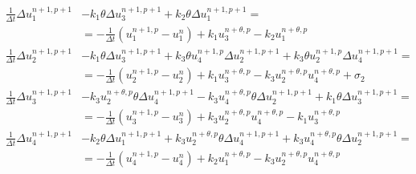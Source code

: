 \documentclass[biblatex]{mooiman_memo}
\newcommand{\Dt}{\Delta t}
\begin{document}
\begin{align}
    \frac{1}{\Dt}\Delta u_1^{n+1, p+1} &  - k_1  \theta \Delta u_3^{n+1, p+1} + k_2  \theta \Delta u_1^{n+1, p+1}  =
    \\
    & = - \frac{1}{\Dt}(u_1^{n+1,p} - u_1^n) + k_1 u_3^{n+\theta,p} - k_2 u_1^{n+\theta,p}
    \\
    \frac{1}{\Dt}\Delta u_2^{n+1, p+1} & - k_1 \theta \Delta u_3^{n+1, p+1}
    + k_3 \theta u_4^{n+1,p} \Delta u_2^{n+1, p+1} + k_3 \theta u_2^{n+1,p} \Delta u_4^{n+1, p+1}  =
    \\
    & = - \frac{1}{\Dt}(u_2^{n+1,p} - u_2^n) + k_1 u_3^{n+\theta,p} - k_3 u_2^{n+\theta,p} u_4^{n+\theta,p} +\sigma_2
    \\
    \frac{1}{\Dt}\Delta u_3^{n+1, p+1} & - k_3 u_2^{n+\theta,p} \theta \Delta u_4^{n+1, p+1} - k_3 u_4^{n+\theta,p} \theta \Delta u_2^{n+1, p+1} + k_1 \theta \Delta u_3^{n+1, p+1}  =
    \\
    & = - \frac{1}{\Dt}(u_3^{n+1,p} - u_3^n) + k_3 u_2^{n+\theta,p} u_4^{n+\theta,p} - k_1 u_3^{n+\theta,p}
    \\
    \frac{1}{\Dt}\Delta u_4^{n+1, p+1}&  - k_2 \theta \Delta u_1^{n+1, p+1}  + k_3 u_2^{n+\theta,p}\theta \Delta u_4^{n+1, p+1} +k_3 u_4^{n+\theta,p} \theta \Delta u_2^{n+1, p+1} =
    \\
    & = - \frac{1}{\Dt}(u_4^{n+1,p} - u_4^n) + k_2 u_1^{n+\theta,p} - k_3 u_2^{n+\theta,p} u_4^{n+\theta,p}
\end{align}


\newpage
\end{document}
